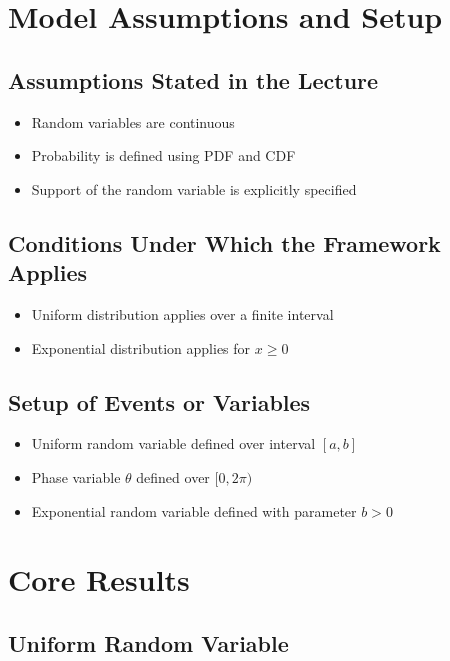 \documentclass[12pt]{article}
\begin{document}
\newpage

\section{Model Assumptions and Setup}

\subsection{Assumptions Stated in the Lecture}
\begin{itemize}
    \item Random variables are continuous
    \item Probability is defined using PDF and CDF
    \item Support of the random variable is explicitly specified
\end{itemize}

\subsection{Conditions Under Which the Framework Applies}
\begin{itemize}
    \item Uniform distribution applies over a finite interval
    \item Exponential distribution applies for $x \ge 0$
\end{itemize}

\subsection{Setup of Events or Variables}
\begin{itemize}
    \item Uniform random variable defined over interval $[a,b]$
    \item Phase variable $\theta$ defined over $[0,2\pi)$
    \item Exponential random variable defined with parameter $b>0$
\end{itemize}

\newpage

\section{Core Results}

\subsection{Uniform Random Variable}
\end{document}
